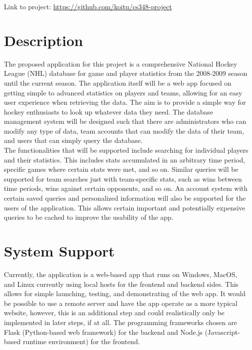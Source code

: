 \documentclass[11pt]{article}
\begin{document}
Link to project: \url{https://github.com/koitu/cs348-project}

\section{Description}

The proposed application for this project is a comprehensive National Hockey League (NHL) database for game and player statistics from the 2008-2009 season until the current season. The application itself will be a web app focused on getting simple to advanced statistics on players and teams, allowing for an easy user experience when retrieving the data. The aim is to provide a simple way for hockey enthusiasts to look up whatever data they need. The database management system will be designed such that there are administrators who can modify any type of data, team accounts that can modify the data of their team, and users that can simply query the database. \\

The functionalities that will be supported include searching for individual players and their statistics. This includes stats accumulated in an arbitrary time period, specific games where certain stats were met, and so on. Similar queries will be supported for team searches just with team-specific stats, such as wins between time periods, wins against certain opponents, and so on. An account system with certain saved queries and personalized information will also be supported for the users of the application. This allows certain important and potentially expensive queries to be cached to improve the usability of the app.


\section{System Support}
Currently, the application is a web-based app that runs on Windows, MacOS, and Linux currently using local hosts for the frontend and backend sides. This allows for simple launching, testing, and demonstrating of the web app. It would be possible to use a remote server and have the app operate as a more typical website, however, this is an additional step and could realistically only be implemented in later steps, if at all. The programming frameworks chosen are Flask (Python-based web framework) for the backend and Node.js (Javascript-based runtime environment) for the frontend. \\
\end{document}
